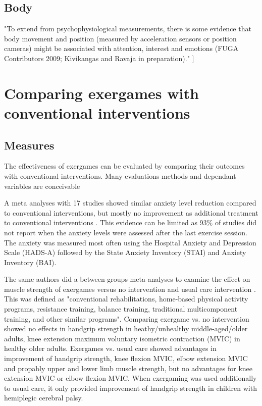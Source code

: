 \subsection{Body}
"To extend from psychophysiological measurements, there is some evidence that body movement and position (measured by acceleration sensors or position cameras) might be associated with
attention, interest and emotions (FUGA Contributors 2009; Kivikangas and
Ravaja in preparation)." \cite{kivikangas2011review}
]
\section{Comparing exergames with conventional interventions}

\subsection{Measures}
The effectiveness of exergames can be evaluated by comparing their outcomes with conventional interventions. Many evaluations methods and dependant variables are conceivable 

A meta analyses with 17 studies showed similar anxiety level reduction compared to conventional interventions, but mostly no improvement as additional treatment to conventional interventions \cite{viana2020effects}. This evidence can be limited as 93\% of studies did not report when the anxiety levels were assessed after the last exercise session. The anxiety was measured most often using the Hospital Anxiety and Depression Scale (HADS-A) followed by the State Anxiety Inventory (STAI) and Anxiety Inventory (BAI).

The same authors did a between-­groups meta-­analyses to examine the effect on muscle strength of exergames versus no intervention and usual care intervention \cite{viana2021effects}. This was defined as "conventional rehabilitations, home-­based physical activity programs, resistance training, balance training, traditional multicomponent training, and other similar programs".
Comparing exergame vs. no intervention showed no effects in handgrip strength in heathy/unhealthy middle-­aged/older adults, knee extension maximum voluntary isometric contraction (MVIC) in healthy older adults. Exergames vs. usual care showed advantages in improvement of handgrip strength, knee flexion MVIC, elbow extension MVIC and propably upper and lower limb muscle strength, but no advantages for knee extension MVIC or elbow flexion MVIC. When exergaming was used additionally to usual care, it only provided improvement of handgrip strength in children with hemiplegic cerebral palsy.

